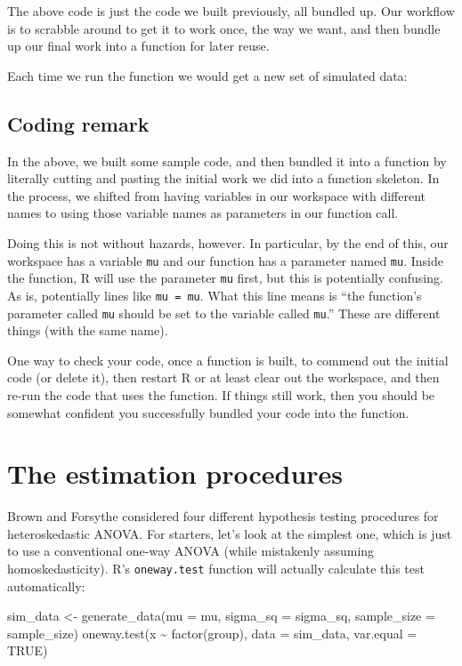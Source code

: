 \documentclass[
]{book}
\newenvironment{Shaded}{\begin{snugshade}}{\end{snugshade}}
\newcommand{\AttributeTok}[1]{\textcolor[rgb]{0.77,0.63,0.00}{#1}}
\newcommand{\ConstantTok}[1]{\textcolor[rgb]{0.00,0.00,0.00}{#1}}
\newcommand{\FunctionTok}[1]{\textcolor[rgb]{0.00,0.00,0.00}{#1}}
\newcommand{\NormalTok}[1]{#1}
\newcommand{\OtherTok}[1]{\textcolor[rgb]{0.56,0.35,0.01}{#1}}
\newcommand{\SpecialCharTok}[1]{\textcolor[rgb]{0.00,0.00,0.00}{#1}}
\begin{document}
The above code is just the code we built previously, all bundled up.
Our workflow is to scrabble around to get it to work once, the way we want, and then bundle up our final work into a function for later reuse.

Each time we run the function we would get a new set of simulated data:

\hypertarget{coding-remark}{%
\subsection{Coding remark}\label{coding-remark}}

In the above, we built some sample code, and then bundled it into a function by literally cutting and pasting the initial work we did into a function skeleton.
In the process, we shifted from having variables in our workspace with different names to using those variable names as parameters in our function call.

Doing this is not without hazards, however.
In particular, by the end of this, our workspace has a variable \texttt{mu} and our function has a parameter named \texttt{mu}.
Inside the function, R will use the parameter \texttt{mu} first, but this is potentially confusing.
As is, potentially lines like \texttt{mu\ =\ mu}.
What this line means is ``the function's parameter called \texttt{mu} should be set to the variable called \texttt{mu}.''
These are different things (with the same name).

One way to check your code, once a function is built, to commend out the initial code (or delete it), then restart R or at least clear out the workspace, and then re-run the code that uses the function.
If things still work, then you should be somewhat confident you successfully bundled your code into the function.

\hypertarget{the-estimation-procedures}{%
\section{The estimation procedures}\label{the-estimation-procedures}}

Brown and Forsythe considered four different hypothesis testing procedures for heteroskedastic ANOVA. For starters, let's look at the simplest one, which is just to use a conventional one-way ANOVA (while mistakenly assuming homoskedasticity). R's \texttt{oneway.test} function will actually calculate this test automatically:

\begin{Shaded}
\begin{Highlighting}[]
\NormalTok{sim\_data }\OtherTok{\textless{}{-}} \FunctionTok{generate\_data}\NormalTok{(}\AttributeTok{mu =}\NormalTok{ mu, }\AttributeTok{sigma\_sq =}\NormalTok{ sigma\_sq,}
                          \AttributeTok{sample\_size =}\NormalTok{ sample\_size)}
\FunctionTok{oneway.test}\NormalTok{(x }\SpecialCharTok{\textasciitilde{}} \FunctionTok{factor}\NormalTok{(group), }\AttributeTok{data =}\NormalTok{ sim\_data, }\AttributeTok{var.equal =} \ConstantTok{TRUE}\NormalTok{)}
\end{Highlighting}
\end{Shaded}
\end{document}
